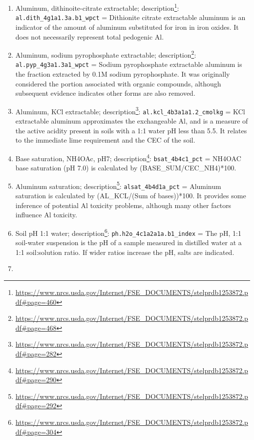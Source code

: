 \documentclass[
  graybox,natbib,nospthms]{svmono}
\renewcommand{\href}[2]{#2 (\url{#1})}
\renewcommand{\href}[2]{#2\footnote{\url{#1}}}
\begin{document}
\begin{enumerate}
\item
  Aluminum, dithinoite-citrate extractable; \href{https://www.nrcs.usda.gov/Internet/FSE_DOCUMENTS/stelprdb1253872.pdf\#page=460}{description}: \texttt{al.dith\_4g1a1.3a.b1\_wpct} = Dithionite citrate extractable aluminum is an indicator of the amount of aluminum substituted for iron in iron oxides. It does not necessarily represent total pedogenic Al.\\
\item
  Aluminum, sodium pyrophosphate extractable; \href{https://www.nrcs.usda.gov/Internet/FSE_DOCUMENTS/stelprdb1253872.pdf\#page=468}{description}: \texttt{al.pyp\_4g3a1.3a1\_wpct} = Sodium pyrophosphate extractable aluminum is the fraction extracted by 0.1M sodium pyrophosphate. It was originally considered the portion associated with organic compounds, although subsequent evidence indicates other forms are also removed.\\
\item
  Aluminum, KCl extractable; \href{https://www.nrcs.usda.gov/Internet/FSE_DOCUMENTS/stelprdb1253872.pdf\#page=282}{description}: \texttt{al.kcl\_4b3a1a1.2\_cmolkg} = KCl extractable aluminum approximates the exchangeable Al, and is a measure of the active acidity present in soils with a 1:1 water pH less than 5.5. It relates to the immediate lime requirement and the CEC of the soil.\\
\item
  Base saturation, NH4OAc, pH7; \href{https://www.nrcs.usda.gov/Internet/FSE_DOCUMENTS/stelprdb1253872.pdf\#page=290}{description}: \texttt{bsat\_4b4c1\_pct} = NH4OAC base saturation (pH 7.0) is calculated by (BASE\_SUM/CEC\_NH4)*100.\\
\item
  Aluminum saturation; \href{https://www.nrcs.usda.gov/Internet/FSE_DOCUMENTS/stelprdb1253872.pdf\#page=292}{description}: \texttt{alsat\_4b4d1a\_pct} = Aluminum saturation is calculated by (AL\_KCL/(Sum of bases))*100. It provides some inference of potential Al toxicity problems, although many other factors influence Al toxicity.\\
\item
  Soil pH 1:1 water; \href{https://www.nrcs.usda.gov/Internet/FSE_DOCUMENTS/stelprdb1253872.pdf\#page=304}{description}: \texttt{ph.h2o\_4c1a2a1a.b1\_index} = The pH, 1:1 soil-water suspension is the pH of a sample measured in distilled water at a 1:1 soil:solution ratio. If wider ratios increase the pH, salts are indicated.\\
\item

\end{enumerate}
\end{document}
